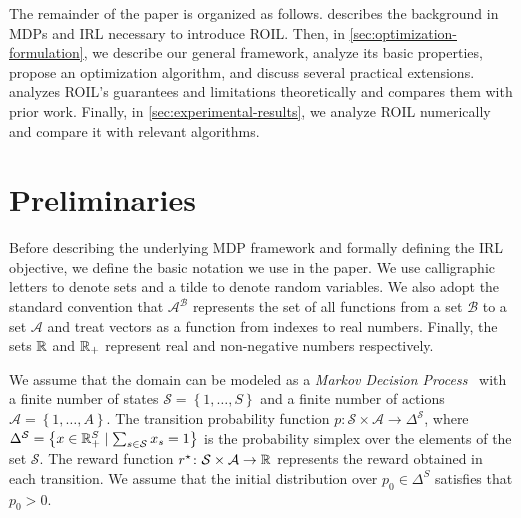 The remainder of the paper is organized as follows.  describes the background in MDPs and IRL necessary to introduce ROIL. Then, in \cref{sec:optimization-formulation}, we describe our general framework, analyze its basic properties, propose an optimization algorithm, and discuss several practical extensions.  analyzes ROIL's guarantees and limitations theoretically and compares them with prior work. Finally, in \cref{sec:experimental-results}, we analyze ROIL numerically and compare it with relevant algorithms. 

\section{Preliminaries}\label{sec:preliminaries}

Before describing the underlying MDP framework and formally defining the IRL objective, we define the basic notation we use in the paper. We use calligraphic letters to denote sets and a tilde to denote random variables. We also adopt the standard convention that $\mathcal{A}^{\mathcal{B}}$ represents the set of all functions from a set $\mathcal{B}$ to a set $\mathcal{A}$ and treat vectors as a function from indexes to real numbers. Finally, the sets $\mathbb{R}$ and $\mathbb{R}_+$ represent real and non-negative numbers respectively. 




We assume that the domain can be modeled as a \emph{Markov Decision Process}~\cite{Puterman1994} with a finite number of states $\mathcal{S} = \left\{ 1, \dots , S \right\}$ and a finite number of actions $\mathcal{A} = \left\{ 1, \dots , A \right\}$. The transition probability function $p\colon \mathcal{S} \times \mathcal{A} \to \Delta^{\mathcal{S}}$, where $\Delta^{\mathcal{S}} = \left\{ x\in \mathbb{R}_{+}^S \mid \sum_{s\in \mathcal{S}} x_s =1 \right\}$ is the probability simplex over the elements of the set $\mathcal{S}$. The reward function $r^{\star} \colon \mathcal{S} \times \mathcal{A} \to \mathbb{R}$ represents the reward obtained in each transition. We assume that the initial distribution over $p_0\in \Delta^S$ satisfies that $p_0 > 0$.


